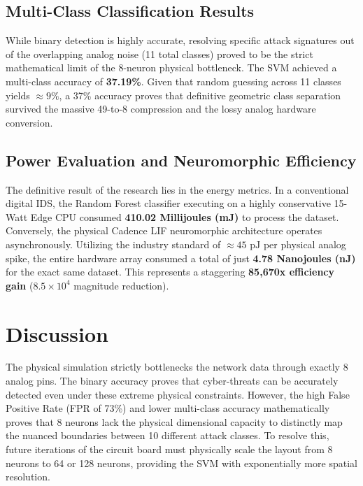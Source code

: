 \documentclass{ieeeaccess}
\begin{document}
\subsection{Multi-Class Classification Results}
While binary detection is highly accurate, resolving specific attack signatures out of the overlapping analog noise (11 total classes) proved to be the strict mathematical limit of the 8-neuron physical bottleneck. The SVM achieved a multi-class accuracy of \textbf{37.19\%}. Given that random guessing across 11 classes yields $\approx 9\%$, a 37\% accuracy proves that definitive geometric class separation survived the massive 49-to-8 compression and the lossy analog hardware conversion.

\subsection{Power Evaluation and Neuromorphic Efficiency}
The definitive result of the research lies in the energy metrics.
In a conventional digital IDS, the Random Forest classifier executing on a highly conservative 15-Watt Edge CPU consumed \textbf{410.02 Millijoules (mJ)} to process the dataset.
Conversely, the physical Cadence LIF neuromorphic architecture operates asynchronously. Utilizing the industry standard of $\approx 45\text{ pJ}$ per physical analog spike, the entire hardware array consumed a total of just \textbf{4.78 Nanojoules (nJ)} for the exact same dataset.
This represents a staggering \textbf{85,670x efficiency gain} ($8.5 \times 10^4$ magnitude reduction).

\section{Discussion}
The physical simulation strictly bottlenecks the network data through exactly 8 analog pins. The binary accuracy proves that cyber-threats can be accurately detected even under these extreme physical constraints. However, the high False Positive Rate (FPR of 73\%) and lower multi-class accuracy mathematically proves that 8 neurons lack the physical dimensional capacity to distinctly map the nuanced boundaries between 10 different attack classes. To resolve this, future iterations of the circuit board must physically scale the layout from 8 neurons to 64 or 128 neurons, providing the SVM with exponentially more spatial resolution.
\end{document}
